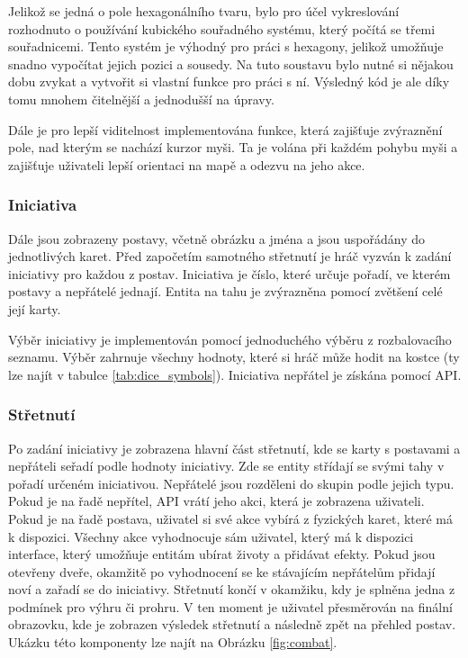 Jelikož se jedná o pole hexagonálního tvaru, bylo pro účel vykreslování rozhodnuto o používání kubického souřadného systému, který počítá se třemi souřadnicemi. Tento systém je výhodný pro práci s hexagony, jelikož umožňuje snadno vypočítat jejich pozici a sousedy. Na tuto soustavu bylo nutné si nějakou dobu zvykat a vytvořit si vlastní funkce pro práci s ní. Výsledný kód je ale díky tomu mnohem čitelnější a jednodušší na úpravy.

Dále je pro lepší viditelnost implementována funkce, která zajišťuje zvýraznění pole, nad kterým se nachází kurzor myši. Ta je volána při každém pohybu myši a zajišťuje uživateli lepší orientaci na mapě a odezvu na jeho akce.

\subsubsection*{Iniciativa}
Dále jsou zobrazeny postavy, včetně obrázku a jména a jsou uspořádány do jednotlivých karet. Před započetím samotného střetnutí je hráč vyzván k zadání iniciativy pro každou z postav. Iniciativa je číslo, které určuje pořadí, ve kterém postavy a nepřátelé jednají. Entita na tahu je zvýrazněna pomocí zvětšení celé její karty.

Výběr iniciativy je implementován pomocí jednoduchého výběru z rozbalovacího seznamu. Výběr zahrnuje všechny hodnoty, které si hráč může hodit na kostce (ty lze najít v tabulce \ref{tab:dice_symbols}). Iniciativa nepřátel je získána pomocí API.

\subsubsection*{Střetnutí}
Po zadání iniciativy je zobrazena hlavní část střetnutí, kde se karty s postavami a nepřáteli seřadí podle hodnoty iniciativy. Zde se entity střídají se svými tahy v pořadí určeném iniciativou. Nepřátelé jsou rozděleni do skupin podle jejich typu. Pokud je na řadě nepřítel, API vrátí jeho akci, která je zobrazena uživateli. Pokud je na řadě postava, uživatel si své akce vybírá z fyzických karet, které má k dispozici. Všechny akce vyhodnocuje sám uživatel, který má k dispozici interface, který umožňuje entitám ubírat životy a přidávat efekty. Pokud jsou otevřeny dveře, okamžitě po vyhodnocení se ke stávajícím nepřátelům přidají noví a zařadí se do iniciativy. Střetnutí končí v okamžiku, kdy je splněna jedna z podmínek pro výhru či prohru. V ten moment je uživatel přesměrován na finální obrazovku, kde je zobrazen výsledek střetnutí a následně zpět na přehled postav. Ukázku této komponenty lze najít na Obrázku \ref{fig:combat}.

